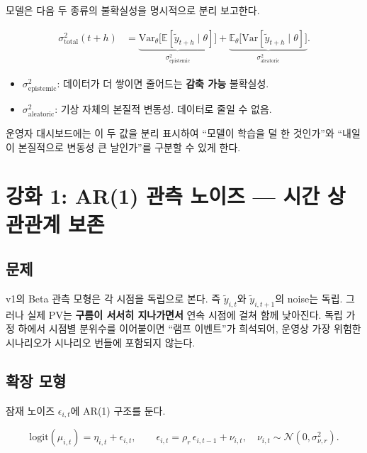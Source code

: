 \documentclass[11pt,a4paper]{article}
\begin{document}
모델은 다음 두 종류의 불확실성을 명시적으로 분리 보고한다.

\begin{align}
    \sigma^2_{\mathrm{total}}(t+h) &= \underbrace{\mathrm{Var}_{\theta}\bigl[\mathbb{E}[\tilde y_{t+h}\mid\theta]\bigr]}_{\sigma^2_{\mathrm{epistemic}}} + \underbrace{\mathbb{E}_{\theta}\bigl[\mathrm{Var}[\tilde y_{t+h}\mid\theta]\bigr]}_{\sigma^2_{\mathrm{aleatoric}}}.
    \label{eq:var_decomp}
\end{align}

\begin{itemize}[leftmargin=2em]
    \item $\sigma^2_{\mathrm{epistemic}}$: 데이터가 더 쌓이면 줄어드는 \textbf{감축 가능} 불확실성.
    \item $\sigma^2_{\mathrm{aleatoric}}$: 기상 자체의 본질적 변동성. 데이터로 줄일 수 없음.
\end{itemize}

운영자 대시보드에는 이 두 값을 분리 표시하여 ``모델이 학습을 덜 한 것인가''와 ``내일이 본질적으로 변동성 큰 날인가''를 구분할 수 있게 한다.

\section{강화 1: AR(1) 관측 노이즈 --- 시간 상관관계 보존}

\subsection{문제}

v1의 Beta 관측 모형은 각 시점을 독립으로 본다. 즉 $\tilde y_{i,t}$와 $\tilde y_{i,t+1}$의 noise는 독립. 그러나 실제 PV는 \textbf{구름이 서서히 지나가면서} 연속 시점에 걸쳐 함께 낮아진다. 독립 가정 하에서 시점별 분위수를 이어붙이면 ``램프 이벤트''가 희석되어, 운영상 가장 위험한 시나리오가 시나리오 번들에 포함되지 않는다.

\subsection{확장 모형}

잠재 노이즈 $\epsilon_{i,t}$에 AR(1) 구조를 둔다.

\begin{equation}
    \mathrm{logit}(\mu_{i,t}) = \eta_{i,t} + \epsilon_{i,t},\qquad
    \epsilon_{i,t} = \rho_r\,\epsilon_{i,t-1} + \nu_{i,t},\quad \nu_{i,t}\sim\mathcal{N}(0,\sigma^2_{\nu,r}).
    \label{eq:ar1_noise}
\end{equation}
\end{document}
